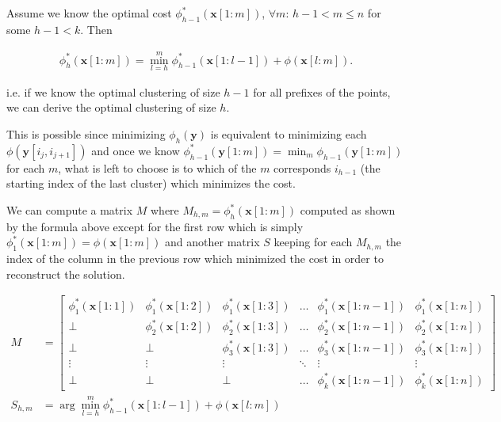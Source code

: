 \documentclass[a4paper]{article}
\begin{document}
\begin{enumerate}
    Assume we know the optimal cost
    $\phi_{h - 1}^*(\mathbf{x}[1:m])$, $\forall m$: $h - 1 < m \le n$ for some
    $h - 1 < k$. Then

    \begin{align*}
      \phi_{h}^*(\mathbf{x}[1:m]) = \min_{l = h}^m
      \phi_{h-1}^*(\mathbf{x}[1:l - 1]) + \phi(\mathbf{x}[l:m]).
    \end{align*}
    
    i.e. if we know the optimal clustering of size $h-1$ for all
    prefixes of the points, we can derive the optimal clustering of size
    $h$.
    
    This is possible since minimizing $\phi_h(\mathbf{y})$ is equivalent to
    minimizing each $\phi(\mathbf{y}[i_{j}, i_{j + 1}])$ and once we know
    $\phi_{h-1}^*(\mathbf{y}[1:m]) = \min_m \phi_{h-1}(\mathbf{y}[1:m])$ for each $m$, what is left to choose is
    to which of the $m$ corresponds $i_{h-1}$ (the starting index of the
    last cluster) which minimizes the cost.

    We can compute a matrix $M$ where $M_{h,m} = \phi_h^*(\mathbf{x}[1:m])$
    computed as shown by the formula above except for the first row which is
    simply $\phi_1^*(\mathbf{x}[1:m]) = \phi(\mathbf{x}[1:m])$
    and another matrix $S$ keeping for
    each $M_{h,m}$ the index of the column in the previous row which minimized
    the cost in order to reconstruct the solution.

    \begin{align*}
      M &= 
      \begin{bmatrix}
        \phi_1^*(\mathbf{x}[1:1]) & \phi_1^*(\mathbf{x}[1:2]) &
        \phi_1^*(\mathbf{x}[1:3]) &\dots  & \phi_1^*(\mathbf{x}[1:n - 1]) &
        \phi_1^*(\mathbf{x}[1:n]) \\
        \bot & \phi_2^*(\mathbf{x}[1:2]) & \phi_2^*(\mathbf{x}[1:3]) & \dots &
        \phi_2^*(\mathbf{x}[1:n - 1]) & \phi_2^*(\mathbf{x}[1:n]) \\
        \bot & \bot & \phi_3^*(\mathbf{x}[1:3]) & \dots  & \phi_3^*(\mathbf{x}[1:n -
        1]) & \phi_3^*(\mathbf{x}[1:n])\\
        \vdots & \vdots & \vdots & \ddots & \vdots & \vdots \\
        \bot & \bot & \bot & \dots  & \phi_k^*(\mathbf{x}[1:n - 1]) & \phi_k^*(\mathbf{x}[1:n])
      \end{bmatrix} \\
      S_{h,m} &= \arg \min_{l = h}^m
      \phi_{h-1}^*(\mathbf{x}[1:l - 1]) + \phi(\mathbf{x}[l:m])
    \end{align*}
    

\end{enumerate}
\end{document}
